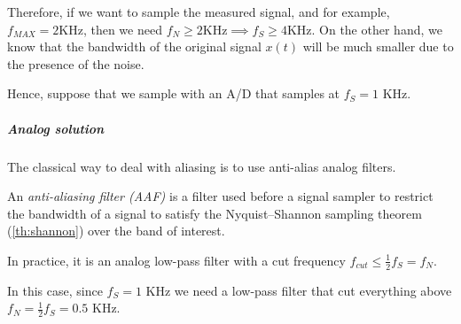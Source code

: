 \begin{appendices}
Therefore, if we want to sample the measured signal, and for example, $f_{MAX} = 2 \text{KHz}$, then we need $f_N \ge 2 \text{KHz} \implies f_S \ge 4 \text{KHz}$. \color{gray} On the other hand, we know that the bandwidth of the original signal $x(t)$ will be much smaller due to the presence of the noise. 

Hence, suppose that we sample with an A/D that samples at $f_S = 1$ KHz.

\subparagraph{Analog solution} The classical way to deal with aliasing is to use anti-alias analog filters. 

\begin{recall}
    An \emph{anti-aliasing filter (AAF)} is a filter used before a signal sampler to restrict the bandwidth of a signal to satisfy the Nyquist–Shannon sampling theorem (\ref{th:shannon}) over the band of interest.
    
    In practice, it is an analog low-pass filter with a cut frequency $f_{cut} \le \frac{1}{2} f_S = f_N$. 
\end{recall}

\begin{figure}[H]
    \centering
\end{figure}

In this case, since $f_S = 1$ KHz we need a low-pass filter that cut everything above $f_N = \frac{1}{2} f_S = 0.5$ KHz.

\begin{figure}[H]
    \centering
\end{figure}
\end{appendices}

